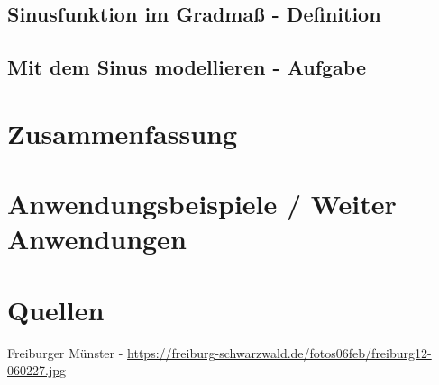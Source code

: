 \documentclass[12pt,a4paper]{article}
\begin{document}
\subsection{Sinusfunktion im Gradmaß - Definition}
\subsection{Mit dem Sinus modellieren - Aufgabe}

\section{Zusammenfassung}

\section{Anwendungsbeispiele / Weiter Anwendungen}

\section{Quellen}
Freiburger Münster - \url{https://freiburg-schwarzwald.de/fotos06feb/freiburg12-060227.jpg}
\end{document}
